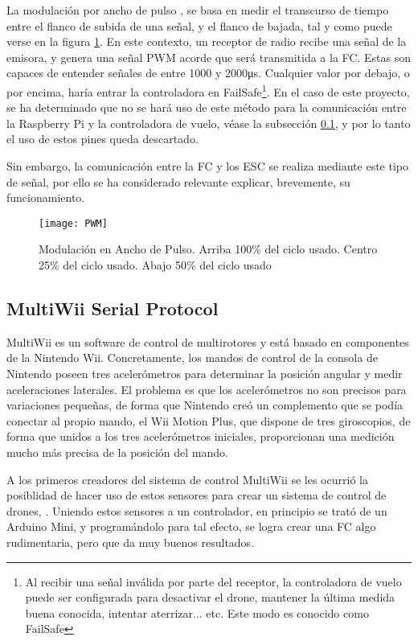 La modulación por ancho de pulso \citep{wiki:PWM}, se basa en medir el transcurso de tiempo entre el flanco de subida de una señal, y el flanco de bajada, tal y como puede verse en la figura \ref{fig:PWM}.
En este contexto, un receptor de radio recibe una señal de la emisora,  y genera una señal PWM acorde que será transmitida a la FC.
Estas son capaces de entender señales de entre 1000 y 2000\si{\us}. Cualquier valor por debajo, o por encima, haría entrar la controladora en FailSafe\footnote{Al recibir una señal inválida por parte del receptor, la controladora de vuelo puede ser configurada para desactivar el drone, mantener la última medida buena conocida, intentar aterrizar... etc. Este modo es conocido como FailSafe}. 
En el caso de este proyecto, se ha determinado que no se hará uso de este método para la comunicación entre la Raspberry Pi y la controladora de vuelo, véase la subsección \ref{subsec:MSP}, y por lo tanto el uso de estos pines queda descartado.

Sin embargo, la comunicación entre la FC y los ESC se realiza mediante este tipo de señal, por ello se ha considerado relevante explicar, brevemente, su funcionamiento.
\begin{figure}[H]
	\centering
	\texttt{[image: PWM]}
	\caption[PWM. Modulación en Ancho de Pulso.]{Modulación en Ancho de Pulso. Arriba 100\% del ciclo usado. Centro 25\% del ciclo usado. Abajo 50\% del ciclo usado}\label{fig:PWM}
\end{figure}


\subsection{MultiWii Serial Protocol}
\label{subsec:MSP}

MultiWii es un software de control de multirotores y está basado en componentes de la Nintendo Wii. Concretamente, los mandos de control de la consola de Nintendo poseen tres acelerómetros para determinar la posición angular y medir aceleraciones laterales. El problema es que los acelerómetros no son precisos para variaciones pequeñas, de forma que Nintendo creó un complemento que se podía conectar al propio mando, el Wii Motion Plus, que dispone de tres giroscopios, de forma que unidos a los tres acelerómetros iniciales, proporcionan una medición mucho más precisa de la posición del mando.

A los primeros creadores del sistema de control MultiWii se les ocurrió la posiblidad de hacer uso de estos sensores para crear un sistema de control de drones, \citep{wiki:MultiWiiHistory}. Uniendo estos sensores a un controlador, en principio se trató de un Arduino Mini, y programándolo para tal efecto, se logra crear una FC algo rudimentaria, pero que da muy buenos resultados.

